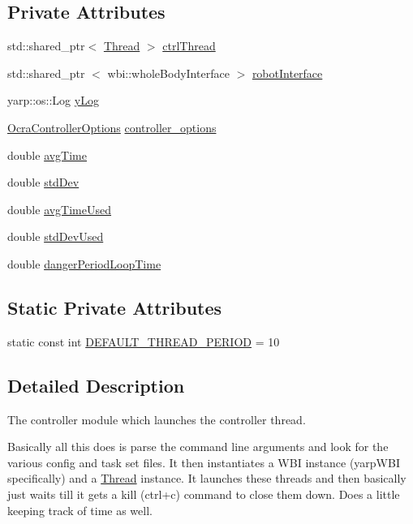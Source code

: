 \subsection*{\-Private \-Attributes}
\begin{DoxyCompactItemize}
\item 
std\-::shared\-\_\-ptr$<$ \hyperlink{classThread}{\-Thread} $>$ \hyperlink{classModule_a39346aa2e2a00801e07f4c127ff004ba}{ctrl\-Thread}
\item 
std\-::shared\-\_\-ptr\*
$<$ wbi\-::whole\-Body\-Interface $>$ \hyperlink{classModule_a0d3efedabcef6ec0db88011ccc2e7205}{robot\-Interface}
\item 
yarp\-::os\-::\-Log \hyperlink{classModule_ae029b50069bf4ff53a6f69a5bae824f6}{y\-Log}
\item 
\hyperlink{classOcraControllerOptions}{\-Ocra\-Controller\-Options} \hyperlink{classModule_a04156183c6e15f118595e3637ab5372f}{controller\-\_\-options}
\item 
double \hyperlink{classModule_a1a20dbf0d18e5020ad85d38a0ba22b88}{avg\-Time}
\item 
double \hyperlink{classModule_af66a2dab82208cb2ea25da22fcaaa4a3}{std\-Dev}
\item 
double \hyperlink{classModule_a5baf8260eb8a45ebbb75474f2b277edc}{avg\-Time\-Used}
\item 
double \hyperlink{classModule_a57060f2788b6dc9906e66432e775e5ac}{std\-Dev\-Used}
\item 
double \hyperlink{classModule_a33fee1e7f977b4f27a2e1488480996fb}{danger\-Period\-Loop\-Time}
\end{DoxyCompactItemize}
\subsection*{\-Static \-Private \-Attributes}
\begin{DoxyCompactItemize}
\item 
static const int \hyperlink{classModule_af73cdfdae53c52ea8488d0d8c4f9083f}{\-D\-E\-F\-A\-U\-L\-T\-\_\-\-T\-H\-R\-E\-A\-D\-\_\-\-P\-E\-R\-I\-O\-D} = 10
\end{DoxyCompactItemize}


\subsection{\-Detailed \-Description}
\-The controller module which launches the controller thread. 

\-Basically all this does is parse the command line arguments and look for the various config and task set files. \-It then instantiates a \-W\-B\-I instance (yarp\-W\-B\-I specifically) and a \hyperlink{classThread}{\-Thread} instance. \-It launches these threads and then basically just waits till it gets a kill (ctrl+c) command to close them down. \-Does a little keeping track of time as well. 

